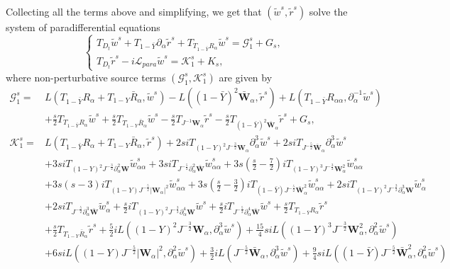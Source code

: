 \documentclass[10pt]{amsart}
\theoremstyle{remark}
\theoremstyle{definition}
\numberwithin{equation}{section}
\newcommand{\p}{\partial}
\newcommand{\al}{\alpha}
\newcommand{\f}{\frac}
\newcommand{\bw}{\mathbf{W}}
\begin{document}
Collecting all the terms above and simplifying, we get that $(\tilde{w}^s, \tilde{r}^s)$ solve the system of paradifferential equations 
\begin{equation}  
\begin{cases}
T_{D_t}\tilde{w}^s +T_{1-\bar{Y}}\partial_{\al} \tilde{r}^s+T_{T_{1-\bar{Y}}R_{\al}}\tilde{w}^s= \mathcal{G}^s_1+ G_s,\\
T_{D_t}\tilde{r}^s-i\mathcal{L}_{para}\tilde{w}^s = \mathcal{K}^s_1+ K_s,
\end{cases}
\end{equation}
where non-perturbative source terms $(\mathcal{G}^s_1, \mathcal{K}^s_1)$ are given by
\begin{align*}
\mathcal{G}^s_1 =& L(T_{1-\bar{Y}}R_\alpha +T_{1-Y}\bar{R}_\alpha, \tilde{w}^s)-L((1-\bar{Y})^2\bar{\bw}_\alpha, \tilde{r}^s)+ L(T_{1-\bar{Y}}R_{\alpha \alpha}, \partial_\alpha^{-1}\tilde{w}^s)\\
&+\f{s}{2} T_{T_{1-\bar{Y}}R_{\al}}\tilde{w}^s +\f{s}{2} T_{T_{1-Y}\bar{R}_{\al}}\tilde{w}^s-\f{s}{2} T_{J^{-1}\bw_{\al}} \tilde{r}^s-\f{s}{2} T_{(1-\bar{Y})^2\bar{\bw}_{\al}}\tilde{r}^s+G_s ,\\ 
\mathcal{K}^s_1 =& L(T_{1-\bar{Y}}R_\alpha +T_{1-Y}\bar{R}_\alpha, \tilde{r}^s)+2si T_{(1-Y)^2J^{-\f32}\bw_{\al}}\p^3_{\al}\tilde{w}^s +2si T_{J^{-\f52}\bar{\bw}_{\al}}\p^3_{\al}\tilde{w}^s\\
&+3si T_{(1-Y)^2J^{-\f32}\p^2_{\al}\bw}\tilde{w}^s_{\al\al}+3si T_{J^{-\f52}\p^2_{\al}\bar{\bw}}\tilde{w}^s_{\al\al}+3s\left(\f{s}{2}-\f72\right)iT_{(1-Y)^3J^{-\f32}\bw^2_{\al}}\tilde{w}^s_{\al\al}\\
&+3s(s-3)iT_{(1-Y)J^{-\f52}|\bw_{\al}|^2}\tilde{w}^s_{\al\al}+3s \left(\f{s}{2}-\f32 \right)iT_{(1-\bar{Y})J^{-\f52}\bar{\bw}_{\al}^2}\tilde{w}^s_{\al\al}+2si T_{(1-Y)^2J^{-\f32}\p^3_{\al}\bw}\tilde{w}^s_{\al}\\
&+2si T_{J^{-\f52}\p^3_{\al}\bar{\bw}}\tilde{w}^s_{\al}+\f{s}{2}i T_{(1-Y)^2J^{-\f32}\p^4_{\al}\bw}\tilde{w}^s+\f{s}{2}i T_{J^{-\f52}\p^4_{\al}\bar{\bw}}\tilde{w}^s  +\f{s}{2} T_{T_{1-\bar{Y}}R_{\al}}\tilde{r}^s\\
&+\f{s}{2} T_{T_{1-Y}\bar{R}_{\al}}\tilde{r}^s+\f52iL( (1-Y)^2J^{-\f32} \bw_\al, \p_\al^3 \tilde{w}^s) +\f{15}{4}si L( (1-Y)^3J^{-\f32} \bw^2_\al, \p_\al^2 \tilde{w}^s)\\ 
&+6si L( (1-Y)J^{-\f52} |\bw_\al|^2, \p_\al^2 \tilde{w}^s)+\f32iL(J^{-\f52} \bar{\bw}_\al, \p_\al^3 \tilde{w}^s) +\f94 si L( (1-\bar{Y})J^{-\f52} \bar{\bw}^2_\al, \p_\al^2 \tilde{w}^s) \\ 

\end{align*}
\end{document}
